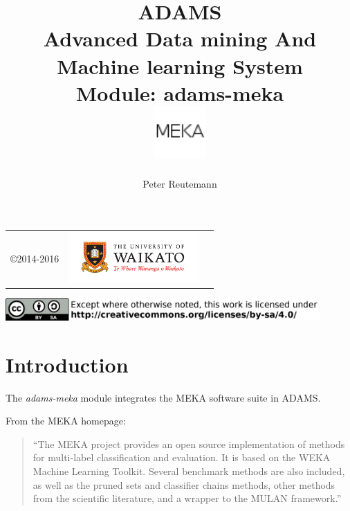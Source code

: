 \documentclass[a4paper]{book}
\title{
  \textbf{ADAMS} \\
  {\Large \textbf{A}dvanced \textbf{D}ata mining \textbf{A}nd \textbf{M}achine
  learning \textbf{S}ystem} \\
  {\Large Module: adams-meka} \\
  \vspace{1cm}
  \includegraphics[width=2cm]{images/meka-module.png} \\
}
\author{
  Peter Reutemann
}
\begin{document}
\begin{titlepage}
\maketitle

\thispagestyle{empty}
\center
\begin{table}[b]
	\begin{tabular}{c l l}
		\parbox[c][2cm]{2cm}{\copyright 2014-2016} &
		\parbox[c][2cm]{5cm}{\includegraphics[width=5cm]{images/coat_of_arms.pdf}} \\
	\end{tabular}
	\includegraphics[width=12cm]{images/cc.png} \\
\end{table}

\end{titlepage}

\tableofcontents
\listoffigures

\chapter{Introduction}
The \textit{adams-meka} module integrates the MEKA \cite{meka} software suite 
in ADAMS.

\noindent From the MEKA homepage:
\begin{quote}
``The MEKA project provides an open source implementation of methods for 
multi-label classification and evaluation. It is based on the WEKA Machine 
Learning Toolkit. Several benchmark methods are also included, as well as the 
pruned sets and classifier chains methods, other methods from the scientific 
literature, and a wrapper to the MULAN framework.''
\end{quote}

\end{document}
